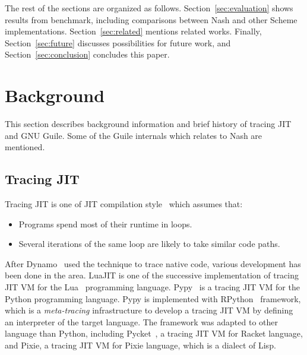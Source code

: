 \documentclass[preprint, 10pt]{sigplanconf}
\begin{document}
The rest of the sections are organized as follows.
Section~\hyperref[sec:evaluation]{\ref{sec:evaluation}} shows results from
benchmark, including comparisons between Nash and other Scheme
implementations. Section~\hyperref[sec:related]{\ref{sec:related}} mentions
related works. Finally, Section~\hyperref[sec:conclusion]{\ref{sec:future}}
discusses possibilities for future work, and
Section~\hyperref[sec:conclusion]{\ref{sec:conclusion}} concludes this paper.

\section{Background}
\label{sec:background}

This section describes background information and brief history of tracing JIT
and GNU Guile. Some of the Guile internals which relates to Nash are
mentioned.

\subsection{Tracing JIT}
Tracing JIT is one of JIT compilation style~\cite{bolz2009tracing} which
assumes that:

\begin{itemize}
\item Programs spend most of their runtime in loops.
\item Several iterations of the same loop are likely to take similar code
  paths.
\end{itemize}

After Dynamo~\cite{bala2000dynamo} used the technique to trace native code,
various development has been done in the area. LuaJIT is one of the successive
implementation of tracing JIT VM for the Lua~\cite{ierusalimschy1996lua}
programming language. Pypy~\cite{bolz2009tracing} is a tracing JIT VM for the
Python programming language. Pypy is implemented with
RPython~\cite{bolz2009tracing} framework, which is a \textit{meta-tracing}
infrastructure to develop a tracing JIT VM by defining an interpreter of the
target language. The framework was adapted to other language than Python,
including Pycket~\citep{bauman2015pycket}, a tracing JIT VM for Racket language,
and Pixie, a tracing JIT VM for Pixie language, which is a dialect of Lisp.
\end{document}

